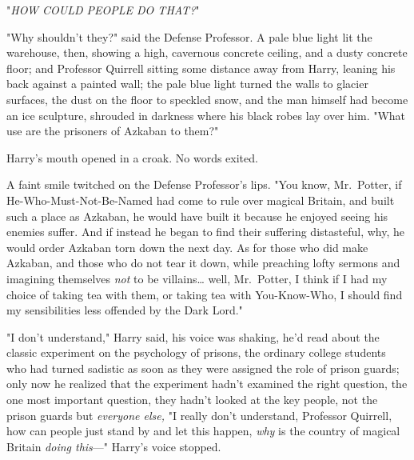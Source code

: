 "\emph{HOW COULD PEOPLE DO THAT?}"

"Why shouldn't they?" said the Defense Professor. A pale blue light lit the
warehouse, then, showing a high, cavernous concrete ceiling, and a dusty
concrete floor; and Professor Quirrell sitting some distance away from Harry,
leaning his back against a painted wall; the pale blue light turned the walls
to glacier surfaces, the dust on the floor to speckled snow, and the man
himself had become an ice sculpture, shrouded in darkness where his black robes
lay over him. "What use are the prisoners of Azkaban to them?"

Harry's mouth opened in a croak. No words exited.

A faint smile twitched on the Defense Professor's lips. "You know, Mr.~Potter,
if He-Who-Must-Not-Be-Named had come to rule over magical Britain, and built
such a place as Azkaban, he would have built it because he enjoyed seeing his
enemies suffer. And if instead he began to find their suffering distasteful,
why, he would order Azkaban torn down the next day. As for those who did make
Azkaban, and those who do not tear it down, while preaching lofty sermons and
imagining themselves \emph{not} to be villains{\ldots} well, Mr.~Potter, I
think if I had my choice of taking tea with them, or taking tea with
You-Know-Who, I should find my sensibilities less offended by the Dark Lord."

"I don't understand," Harry said, his voice was shaking, he'd read about the
classic experiment on the psychology of prisons, the ordinary college students
who had turned sadistic as soon as they were assigned the role of prison
guards; only now he realized that the experiment hadn't examined the right
question, the one most important question, they hadn't looked at the key
people, not the prison guards but \emph{everyone else,} "I really don't
understand, Professor Quirrell, how can people just stand by and let this
happen, \emph{why} is the country of magical Britain \emph{doing this}---"
Harry's voice stopped.

